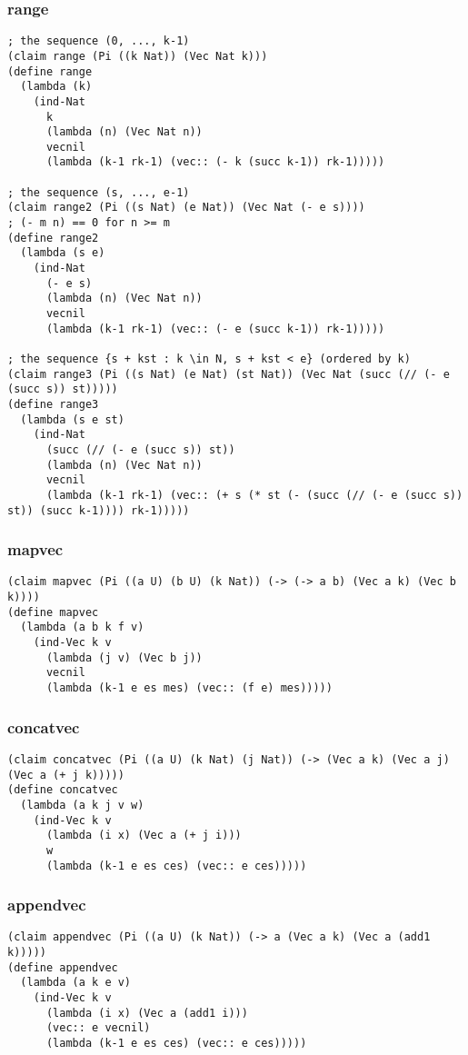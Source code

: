 \subsubsection{range} \label{code:range}
\begin{verbatim}
; the sequence (0, ..., k-1)
(claim range (Pi ((k Nat)) (Vec Nat k)))
(define range
  (lambda (k)
    (ind-Nat
      k
      (lambda (n) (Vec Nat n))
      vecnil
      (lambda (k-1 rk-1) (vec:: (- k (succ k-1)) rk-1)))))

; the sequence (s, ..., e-1)
(claim range2 (Pi ((s Nat) (e Nat)) (Vec Nat (- e s))))
; (- m n) == 0 for n >= m
(define range2
  (lambda (s e)
    (ind-Nat
      (- e s)
      (lambda (n) (Vec Nat n))
      vecnil
      (lambda (k-1 rk-1) (vec:: (- e (succ k-1)) rk-1)))))

; the sequence {s + kst : k \in N, s + kst < e} (ordered by k)
(claim range3 (Pi ((s Nat) (e Nat) (st Nat)) (Vec Nat (succ (// (- e (succ s)) st)))))
(define range3
  (lambda (s e st)
    (ind-Nat
      (succ (// (- e (succ s)) st))
      (lambda (n) (Vec Nat n))
      vecnil
      (lambda (k-1 rk-1) (vec:: (+ s (* st (- (succ (// (- e (succ s)) st)) (succ k-1)))) rk-1)))))
\end{verbatim}

\subsubsection{mapvec} \label{code:mapvec}
\begin{verbatim}
(claim mapvec (Pi ((a U) (b U) (k Nat)) (-> (-> a b) (Vec a k) (Vec b k))))
(define mapvec
  (lambda (a b k f v)
    (ind-Vec k v
      (lambda (j v) (Vec b j))
      vecnil
      (lambda (k-1 e es mes) (vec:: (f e) mes)))))
\end{verbatim}

\subsubsection{concatvec} \label{code:concatvec}
\begin{verbatim}
(claim concatvec (Pi ((a U) (k Nat) (j Nat)) (-> (Vec a k) (Vec a j) (Vec a (+ j k)))))
(define concatvec
  (lambda (a k j v w)
    (ind-Vec k v
      (lambda (i x) (Vec a (+ j i)))
      w
      (lambda (k-1 e es ces) (vec:: e ces)))))
\end{verbatim}

\subsubsection{appendvec} \label{code:appendvec}
\begin{verbatim}
(claim appendvec (Pi ((a U) (k Nat)) (-> a (Vec a k) (Vec a (add1 k)))))
(define appendvec
  (lambda (a k e v)
    (ind-Vec k v
      (lambda (i x) (Vec a (add1 i)))
      (vec:: e vecnil)
      (lambda (k-1 e es ces) (vec:: e ces)))))
\end{verbatim}

